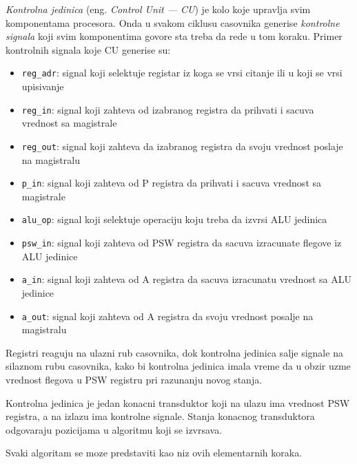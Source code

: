 \documentclass[12p,a4paper]{article}
\begin{document}
\begin{multicols}{2}
    \emph{Kontrolna jedinica} (eng. \emph{Control Unit --- CU}) je kolo
    koje upravlja svim komponentama procesora. Onda u svakom ciklusu 
    casovnika generise \emph{kontrolne signala} koji svim komponentima
    govore sta treba da rede u tom koraku. Primer kontrolnih signala koje
    CU generise su:
    \begin{itemize}
        \itemsep0em
        \item \texttt{reg\_adr}: signal koji selektuje registar iz koga se 
            vrsi citanje ili u koji se vrsi upisivanje
        \item \texttt{reg\_in}: signal koji zahteva od izabranog registra da 
            prihvati i sacuva vrednost sa magistrale
        \item \texttt{reg\_out}: signal koji zahteva da izabranog registra da 
            svoju vrednost poslaje na magistralu
        \item \texttt{p\_in}: signal koji zahteva od P registra da prihvati
            i sacuva vrednost sa magistrale
        \item \texttt{alu\_op}: signal koji selektuje operaciju koju treba da
            izvrsi ALU jedinica
        \item \texttt{psw\_in}: signal koji zahteva od PSW registra da sacuva
            izracunate flegove iz ALU jedinice
        \item \texttt{a\_in}: signal koji zahteva od A registra da sacuva
            izracunatu vrednost sa ALU jedinice
        \item \texttt{a\_out}: signal koji zahteva od A registra da svoju 
            vrednost posalje na magistralu
    \end{itemize}

    Registri reaguju na ulazni rub casovnika, dok kontrolna jedinica salje
    signale na silaznom rubu casovnika, kako bi kontrolna jedinica imala vreme
    da u obzir uzme vrednost flegova u PSW registru pri razunanju novog 
    stanja.

    Kontrolna jedinica je jedan konacni transduktor koji na ulazu ima 
    vrednost PSW registra, a na izlazu ima kontrolne signale. Stanja konacnog 
    transduktora odgovaraju pozicijama u algoritmu koji se izvrsava.

    Svaki algoritam se moze predstaviti kao niz ovih elementarnih koraka.
    

\end{multicols}
\end{document}
